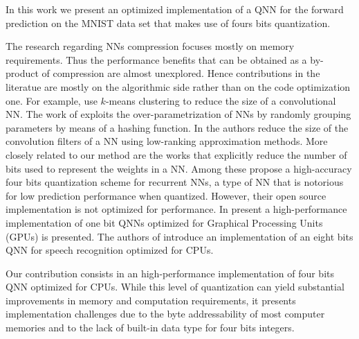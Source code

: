 In this work we present an optimized implementation of a QNN for the forward prediction on the MNIST data set that makes use of fours bits quantization. 

%
%

 The research regarding NNs compression focuses mostly on memory requirements. Thus the performance benefits that can be obtained as a by-product of compression are almost  unexplored. Hence   contributions in the literatue are mostly on the algorithmic side rather than on the code optimization one. For example, \cite{gong_compressing_2014} use $k$-means clustering to reduce the size of  a convolutional NN. The work of \cite{chen_compressing_2015} exploits the over-parametrization of NNs by randomly grouping parameters by means of a hashing function. In \cite{denton_exploiting_2014} the authors reduce the size of the convolution filters of a NN using low-ranking approximation methods.	More closely related to our method are the works that explicitly reduce the number of bits used to represent the weights in a NN. Among these \cite{he_effective_2016} propose a high-accuracy four bits quantization scheme for recurrent NNs, a type of NN that is notorious for low prediction performance when quantized. However, their open source implementation is not optimized for performance. In \cite{hubara_binarized_2016} present a high-performance implementation of one bit QNNs optimized for Graphical Processing Units (GPUs) is presented. The authors of \cite{vanhoucke_improving_2011} introduce an implementation of an eight bits QNN for speech recognition optimized for CPUs.

Our contribution consists in an high-performance implementation of four bits QNN optimized for CPUs. While this level of quantization can yield substantial improvements in memory and computation requirements, it presents implementation challenges due to the byte addressability of most computer memories and to the lack of built-in data type for four bits integers.


